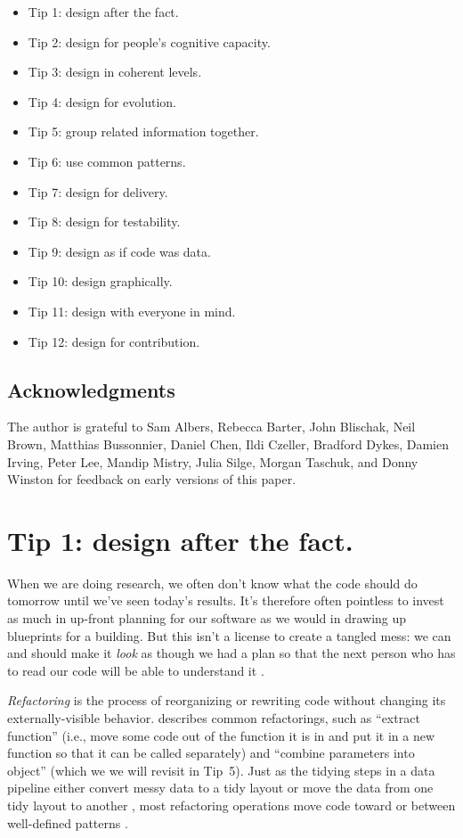 \documentclass[10pt,letterpaper]{article}
\begin{document}
\begin{itemize}
  \itemsep0em
  \item[] Tip 1: design after the fact.
  \item[] Tip 2: design for people's cognitive capacity.
  \item[] Tip 3: design in coherent levels.
  \item[] Tip 4: design for evolution.
  \item[] Tip 5: group related information together.
  \item[] Tip 6: use common patterns.
  \item[] Tip 7: design for delivery.
  \item[] Tip 8: design for testability.
  \item[] Tip 9: design as if code was data.
  \item[] Tip 10: design graphically.
  \item[] Tip 11: design with everyone in mind.
  \item[] Tip 12: design for contribution.
\end{itemize}

\subsection*{Acknowledgments}

The author is grateful to Sam Albers,
Rebecca Barter,
John Blischak,
Neil Brown,
Matthias Bussonnier,
Daniel Chen,
Ildi Czeller,
Bradford Dykes,
Damien Irving,
Peter Lee,
Mandip Mistry,
Julia Silge,
Morgan Taschuk,
and Donny Winston
for feedback on early versions of this paper.

\section*{Tip 1: design after the fact.}

When we are doing research,
we often don't know what the code should do tomorrow
until we've seen today's results.
It's therefore often pointless to invest as much in up-front planning for our software
as we would in drawing up blueprints for a building.
But this isn't a license to create a tangled mess:
we can and should make it \emph{look} as though we had a plan
so that the next person who has to read our code will be able to understand it \cite{Parnas1986}.

\emph{Refactoring} is the process of reorganizing or rewriting code
without changing its externally-visible behavior.
\cite{Fowler2018} describes common refactorings,
such as ``extract function''
(i.e., move some code out of the function it is in
and put it in a new function so that it can be called separately)
and ``combine parameters into object''
(which we we will revisit in Tip~5).
Just as the tidying steps in a data pipeline
either convert messy data to a tidy layout or move the data from one tidy layout to another \cite{Wickham2017},
most refactoring operations move code toward or between well-defined patterns \cite{Kerievsky2004}.
\end{document}
